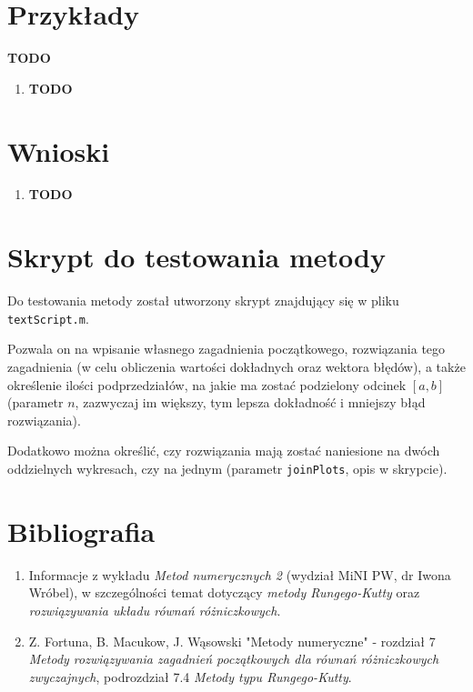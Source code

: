 \documentclass[12pt]{article}
\begin{document}
	
	
	\section{Przykłady}
	\textbf{TODO}
	
	\begin{enumerate}[label=\textbf{Przykład \arabic*}]
		\item
		\textbf{TODO}
	\end{enumerate}
	
	
	
	
	\section{Wnioski}
	\begin{enumerate}
		\item \textbf{TODO}
	\end{enumerate}
	
	
	
	\section{Skrypt do testowania metody}
	Do testowania metody został utworzony skrypt znajdujący się w pliku \texttt{textScript.m}.
	
	Pozwala on na wpisanie własnego zagadnienia początkowego, rozwiązania tego zagadnienia (w celu obliczenia wartości dokładnych oraz wektora błędów), a także określenie ilości podprzedziałów, na jakie ma zostać podzielony odcinek $[a, b]$ (parametr $n$, zazwyczaj im większy, tym lepsza dokładność i mniejszy błąd rozwiązania).
	
	Dodatkowo można określić, czy rozwiązania mają zostać naniesione na dwóch oddzielnych wykresach, czy na jednym (parametr \texttt{joinPlots}, opis w skrypcie).
	
	
	\section{Bibliografia}
	\begin{enumerate}
		\item Informacje z wykładu \textit{Metod numerycznych 2} (wydział MiNI PW, dr Iwona Wróbel), w szczególności temat dotyczący \textit{metody Rungego-Kutty} oraz \textit{rozwiązywania układu równań różniczkowych}.
		\item Z. Fortuna, B. Macukow, J. Wąsowski "Metody numeryczne" - rozdział 7 \textit{Metody rozwiązywania zagadnień początkowych dla równań różniczkowych zwyczajnych}, podrozdział 7.4 \textit{Metody typu Rungego-Kutty}.
	\end{enumerate}
	
\end{document}
